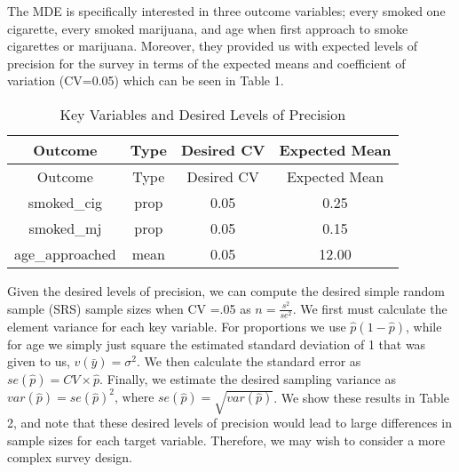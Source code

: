 \documentclass[
  12pt]{article}
\begin{document}
The MDE is specifically interested in three outcome variables; every
smoked one cigarette, every smoked marijuana, and age when first
approach to smoke cigarettes or marijuana. Moreover, they provided us
with expected levels of precision for the survey in terms of the
expected means and coefficient of variation (CV=0.05) which can be seen
in Table 1.

\begin{longtable}[]{@{}cccc@{}}
\caption{Key Variables and Desired Levels of Precision}\tabularnewline
\toprule\noalign{}
Outcome & Type & Desired CV & Expected Mean \\
\midrule\noalign{}
\endfirsthead
\toprule\noalign{}
Outcome & Type & Desired CV & Expected Mean \\
\midrule\noalign{}
\endhead
\bottomrule\noalign{}
\endlastfoot
smoked\_cig & prop & 0.05 & 0.25 \\
smoked\_mj & prop & 0.05 & 0.15 \\
age\_approached & mean & 0.05 & 12.00 \\
\end{longtable}

Given the desired levels of precision, we can compute the desired simple
random sample (SRS) sample sizes when CV =.05 as
\(n = \frac{s^2}{se^2}\). We first must calculate the element variance
for each key variable. For proportions we use \(\hat{p}(1-\hat{p})\),
while for age we simply just square the estimated standard deviation of
1 that was given to us, \(v(\bar{y}) = \sigma^2\). We then calculate the
standard error as \(se(\hat{p}) = CV \times \hat{p}\). Finally, we
estimate the desired sampling variance as
\(var(\hat{p}) =  se(\hat{p})^2 \text{, where }  se(\hat{p}) = \sqrt{var(\hat{p})}\).
We show these results in Table 2, and note that these desired levels of
precision would lead to large differences in sample sizes for each
target variable. Therefore, we may wish to consider a more complex
survey design.
\end{document}

